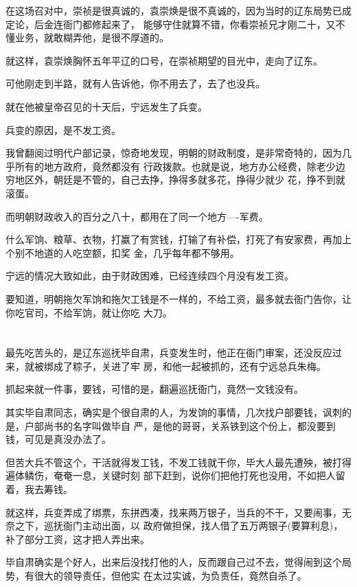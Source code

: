\documentclass[11pt,a4paper,onecolumn]{article}
\begin{document}
在这场召对中，崇祯是很真诚的，袁崇焕是很不真诚的，因为当时的辽东局势已成定论，后金连衙门都修起来了，
能够守住就算不错，你看崇祯兄才刚二十，又不懂业务，就敢糊弄他，是很不厚道的。

就这样，袁崇焕胸怀五年平辽的口号，在崇祯期望的目光中，走向了辽东。

可他刚走到半路，就有人告诉他，你不用去了，去了也没兵。

就在他被皇帝召见的十天后，宁远发生了兵变。

兵变的原因，是不发工资。

我曾翻阅过明代户部记录，惊奇地发现，明朝的财政制度，是非常奇特的，因为几乎所有的地方政府，竟然都没有
行政拨款。也就是说，地方办公经费，除老少边穷地区外，朝廷是不管的，自己去挣，挣得多就多花，挣得少就少
花，挣不到就滚蛋。

而明朝财政收入的百分之八十，都用在了同一个地方----军费。

什么军饷、粮草、衣物，打赢了有赏钱，打输了有补偿，打死了有安家费，再加上个别不地道的人吃空额，扣奖
金，几乎每年都不够用。

宁远的情况大致如此，由于财政困难，已经连续四个月没有发工资。

要知道，明朝拖欠军饷和拖欠工钱是不一样的，不给工资，最多就去衙门告你，让你吃官司，不给军饷，就让你吃
大刀。

\section[\thesection]{}

最先吃苦头的，是辽东巡抚毕自肃，兵变发生时，他正在衙门审案，还没反应过来，就被绑成了粽子，关进了牢
房，和他一起被抓的，还有宁远总兵朱梅。

抓起来就一件事，要钱，可惜的是，翻遍巡抚衙门，竟然一文钱没有。

其实毕自肃同志，确实是个很自肃的人，为发饷的事情，几次找户部要钱，讽刺的是，户部尚书的名字叫做毕自
严，是他的哥哥，关系铁到这个份上，都没要到钱，可见是真没办法了。

但苦大兵不管这个，干活就得发工钱，不发工钱就干你，毕大人最先遭殃，被打得遍体鳞伤，奄奄一息，关键时刻
部下赶到，说你们把他打死也没用，不如把人留着，我去筹钱。

就这样，兵变弄成了绑票，东拼西凑，找来两万银子，当兵的不干，又要闹事，无奈之下，巡抚衙门主动出面，以
政府做担保，找人借了五万两银子(要算利息)，补了部分工资，这才把人弄出来。

毕自肃确实是个好人，出来后没找打他的人，反而跟自己过不去，觉得闹到这个局势，有很大的领导责任，但他实
在太过实诚，为负责任，竟然自杀了。
\end{document}
